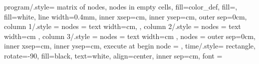 \documentclass{article}
\begin{document}
\sloppy
\pagestyle{empty}
\setlength{\parindent}{0cm} %
\frenchspacing

\small


\tikzset
{
    program/.style=
    {
        matrix of nodes,
        nodes in empty cells,
        fill=color_def,
        fill=,
        fill=white,
        line width=0.4mm,
        inner xsep=cm,
        inner ysep=cm,
        outer sep=0cm,
        column 1/.style =
        {
            nodes =
            {
                text width=cm,
            }
        },
        column 2/.style =
        {
            nodes =
            {
                text width=cm
            }
        },
        column 3/.style =
        {
            nodes =
            {
                text width=cm
            }
        },
        nodes =
        {
            outer sep=0cm,
            inner xsep=cm,
            inner ysep=cm,
            execute at begin node = 
        }
    },
    time/.style=
    {
        rectangle,
        rotate=-90,
        fill=black,
        text=white,
        align=center,
        inner sep=cm,
        font = \Large
    }
}

\end{document}
